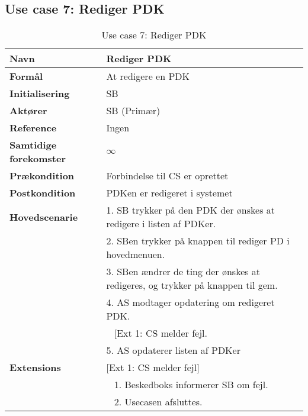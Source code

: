 \subsection{Use case 7: Rediger \gls{PDK}}


\begin{table}[H]
\begin{tabularx}{\textwidth}{|l|X|}
\hline
\textbf{Navn}					& Rediger \gls{PDK} \\\hline
\textbf{Formål}					& At redigere en \gls{PDK} \\\hline
\textbf{Initialisering}			& \gls{SB} \\\hline
\textbf{Aktører}				& \gls{SB} (Primær)\\\hline
\textbf{Reference}				& Ingen \\\hline
								
\textbf{Samtidige forekomster}	& $\infty$ \\\hline

\textbf{Prækondition}			& Forbindelse til \gls{CS} er oprettet \\\hline

\textbf{Postkondition}			& \gls{PDK}en er redigeret i systemet \\\hline

\textbf{Hovedscenarie}			& 1. \gls{SB} trykker på den \gls{PDK} der ønskes at redigere i listen af \gls{PDK}er. \\		
								& 2. \gls{SB}en trykker på knappen til rediger \gls{PD} i hovedmenuen.\\
								& 3.  \gls{SB}en ændrer de ting der ønskes at redigeres, og trykker på knappen til gem. \\
								& 4. \gls{AS} modtager opdatering om redigeret \gls{PDK}. \\
								& ~ [Ext 1: \gls{CS} melder fejl.\\
								& 5. \gls{AS} opdaterer listen af \gls{PDK}er \\\hline

\textbf{Extensions}							
								& [Ext 1: \gls{CS} melder fejl]\\
								& ~ 1. Beskedboks informerer \gls{SB} om fejl.\\
								& ~ 2. Usecasen afsluttes.\\\hline
\end{tabularx}
\caption{Use case 7: Rediger \gls{PDK}}
\label{tab:UCrpk}
\end{table}